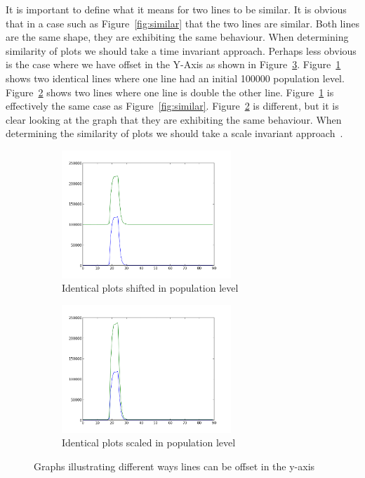 It is important to define what it means for two lines to be similar.  It is obvious that in a case such as Figure~\ref{fig:similar} that the two lines are similar.  Both lines are the same shape, they are exhibiting the same behaviour.  When determining similarity of plots we should take a time invariant approach.  Perhaps less obvious is the case where we have offset in the Y-Axis as shown in Figure~\ref{fig:similar_y}.  Figure~\ref{fig:similar_1} shows two identical lines where one line had an initial 100000 population level.  Figure~\ref{fig:similar_2} shows two lines where one line is double the other line.  Figure~\ref{fig:similar_1} is effectively the same case as Figure~\ref{fig:similar}.  Figure~\ref{fig:similar_2} is different, but it is clear looking at the graph that they are exhibiting the same behaviour. When determining the similarity of plots we should take a scale invariant approach~\cite{esling}.

\begin{figure}[h!]
    \centering
    \begin{subfigure}[b]{0.6\textwidth}
        \centering
        \includegraphics[width=0.7\textwidth]{images/similar_plots_2.png}
        \caption{Identical plots shifted in population level}
        \label{fig:similar_1}
    \end{subfigure}

    \begin{subfigure}[b]{0.6\textwidth}
        \centering
        \includegraphics[width=0.7\textwidth]{images/similar_plots_3.png}
        \caption{Identical plots scaled in population level}
        \label{fig:similar_2}
    \end{subfigure}
    \caption{Graphs illustrating different ways lines can be offset in the y-axis}
    \label{fig:similar_y}
\end{figure}

